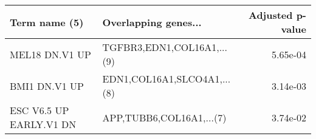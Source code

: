\begin{tabular}{llr}
\toprule
          Term name (5) &        Overlapping genes... &  Adjusted p-value \\
\midrule
         MEL18 DN.V1 UP &  TGFBR3,EDN1,COL16A1,...(9) &          5.65e-04 \\
          BMI1 DN.V1 UP & EDN1,COL16A1,SLCO4A1,...(8) &          3.14e-03 \\
ESC V6.5 UP EARLY.V1 DN &    APP,TUBB6,COL16A1,...(7) &          3.74e-02 \\
\bottomrule
\end{tabular}
